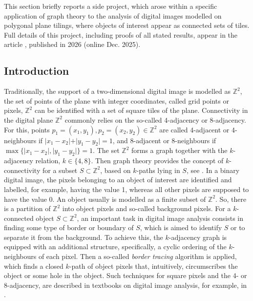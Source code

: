 This section briefly reports a side project, which arose within a specific application of graph theory to the analysis of digital images modelled on polygonal plane tilings, where objects of interest appear as connected sets of tiles. Full details of this project, including proofs of all stated results, appear in the article \cite{WiederholdMatosWiederhold2026}, published in 2026 (online Dec. 2025).


\subsection{Introduction}

Traditionally, the support of a two-dimensional digital image is modelled as $\mathbb{Z}^2$, the set of points of the plane with integer coordinates, called grid points or pixels, $\mathbb{Z}^2$ can be identified with a set of square tiles of the plane. Connectivity in the digital plane $\mathbb{Z}^2$ commonly relies on the so-called 4-adjacency or 8-adjacency. For this, points $p_1=(x_1,y_1), p_2=(x_2,y_2)\in \mathbb{Z}^2$ are called 4-adjacent or 4-neighbours if $\vert x_1 - x_2\vert + \vert y_1 - y_2\vert =1$, and 8-adjacent or 8-neighbours if $\max\{ \vert x_1 - x_2\vert , \vert y_1 - y_2\vert \} =1$. The set $\mathbb{Z}^2$ forms a graph together with the $k$-adjacency relation, $k\in \{ 4,8\}$. Then graph theory provides the concept of $k$-connectivity for a subset $S\subset \mathbb{Z}^2$, based on $k$-paths lying in $S$, see \cite{gonzalez2018,klette2004}. In a binary digital image, the pixels belonging to an object of interest are identified and labelled, for example, having the value 1, whereas all other pixels are supposed to have the value 0. An object usually is modelled as a finite subset of $\mathbb{Z}^2$. So, there is a partition of $\mathbb{Z}^2$ into object pixels and so-called background pixels. For a $k$-connected object $S\subset \mathbb{Z}^2$, an important task in digital image analysis consists in finding some type of border or boundary of $S$, which is aimed to identify $S$ or to separate it from the background. To achieve this, the $k$-adjacency graph is equipped with an additional structure, specifically, a cyclic ordering of the $k$-neighbours of each pixel. Then a so-called \emph{border tracing} algorithm is applied, which finds a closed $k$-path of object pixels that, intuitively, circumscribes the object or some hole in the object. Such techniques for square pixels and the 4- or 8-adjacency, are described in textbooks on digital image analysis, for example, in \cite{gonzalez2018,klette2004}.

